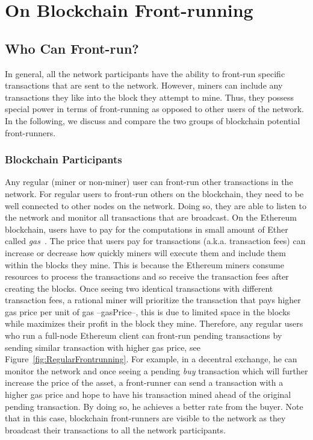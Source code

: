 

\section{On Blockchain Front-running}

\subsection{Who Can Front-run?}
\label{sec:who can front-run?}

In general, all the network participants have the ability to front-run specific transactions that are sent to the network. However, miners can include any transactions they like into the block they attempt to mine. Thus, they possess special power in terms of front-running as opposed to other users of the network. In the following, we discuss and compare the two groups of blockchain potential front-runners.

\subsubsection{Blockchain Participants}
Any regular (miner or non-miner) user can front-run other transactions in the network. For regular users to front-run others on the blockchain, they need to be well connected to other nodes on the network. Doing so, they are able to listen to the network and monitor all transactions that are broadcast. On the Ethereum blockchain, users have to pay for the computations in small amount of Ether called \textit{gas}~\cite{AccountT67:online}. The price that users pay for transactions (a.k.a. transaction fees) can increase or decrease how quickly miners will execute them and include them within the blocks they mine. This is because the Ethereum miners consume resources to process the transactions and so receive the transaction fees after creating the blocks. Once seeing two identical transactions with different transaction fees,  a rational miner will prioritize the transaction that pays higher gas price per unit of gas --gasPrice--, this is due to limited space in the blocks while maximizes their profit in the block they mine. Therefore, any regular users who run a full-node Ethereum client can front-run pending transactions by sending similar transaction with higher gas price, see Figure~\ref{fig:RegularFrontrunning}. For example, in a decentral exchange, he can monitor the network and once seeing a pending \textit{buy} transaction which will further increase the price of the asset, a front-runner can send a transaction with a higher gas price and hope to have his transaction mined ahead of the original pending transaction. By doing so, he achieves a better rate from the buyer. Note that in this case, blockchain front-runners are visible to the network as they broadcast their transactions to all the network participants. 

